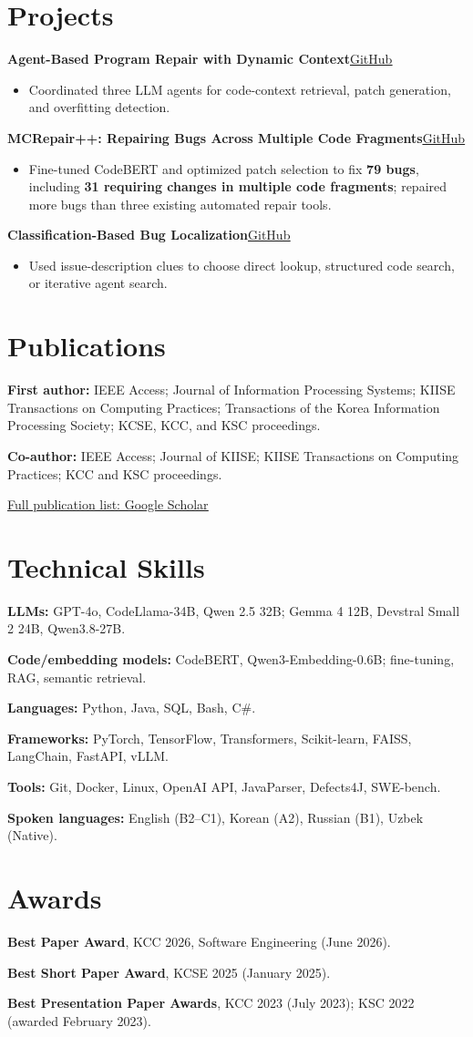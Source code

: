 \documentclass[letterpaper,11pt]{article}
\newcommand{\projectHeading}[2]{\textbf{#1}\hfill\href{#2}{\underline{GitHub}}\par}
\begin{document}
\section{Projects}
\projectHeading{Agent-Based Program Repair with Dynamic Context}{https://github.com/soft7197/dcsa4apr}
\begin{itemize}
  \item Coordinated three LLM agents for code-context retrieval, patch generation, and overfitting detection.
\end{itemize}
\projectHeading{MCRepair++: Repairing Bugs Across Multiple Code Fragments}{https://github.com/kimjisung78/MCRepair-Plus-Plus}
\begin{itemize}
  \item Fine-tuned CodeBERT and optimized patch selection to fix \textbf{79 bugs}, including \textbf{31 requiring changes in multiple code fragments}; repaired more bugs than three existing automated repair tools.
\end{itemize}
\projectHeading{Classification-Based Bug Localization}{https://github.com/soft7197/cbfl}
\begin{itemize}
  \item Used issue-description clues to choose direct lookup, structured code search, or iterative agent search.
\end{itemize}

\section{Publications}
\textbf{First author:} IEEE Access; Journal of Information Processing Systems; KIISE Transactions on Computing Practices; Transactions of the Korea Information Processing Society; KCSE, KCC, and KSC proceedings.\par
\textbf{Co-author:} IEEE Access; Journal of KIISE; KIISE Transactions on Computing Practices; KCC and KSC proceedings.\par
\href{https://scholar.google.com/citations?user=W-YakaQAAAAJ}{\underline{Full publication list: Google Scholar}}

\section{Technical Skills}
\textbf{LLMs:} GPT-4o, CodeLlama-34B, Qwen 2.5 32B; Gemma 4 12B, Devstral Small 2 24B, Qwen3.8-27B.\par
\textbf{Code/embedding models:} CodeBERT, Qwen3-Embedding-0.6B; fine-tuning, RAG, semantic retrieval.\par
\textbf{Languages:} Python, Java, SQL, Bash, C\#.\par
\textbf{Frameworks:} PyTorch, TensorFlow, Transformers, Scikit-learn, FAISS, LangChain, FastAPI, vLLM.\par
\textbf{Tools:} Git, Docker, Linux, OpenAI API, JavaParser, Defects4J, SWE-bench.\par
\textbf{Spoken languages:} English (B2--C1), Korean (A2), Russian (B1), Uzbek (Native).

\section{Awards}
\textbf{Best Paper Award}, KCC 2026, Software Engineering (June 2026).\par
\textbf{Best Short Paper Award}, KCSE 2025 (January 2025).\par
\textbf{Best Presentation Paper Awards}, KCC 2023 (July 2023); KSC 2022 (awarded February 2023).
\end{document}
